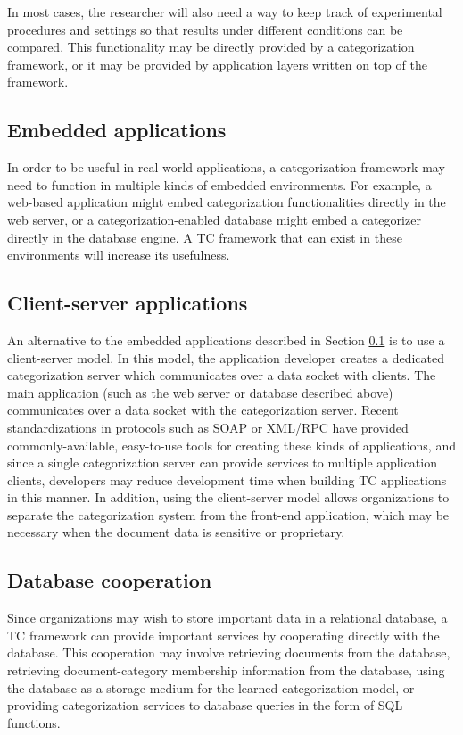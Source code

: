 In most cases, the researcher will also need a way to keep track of
experimental procedures and settings so that results under different
conditions can be compared.  This functionality may be directly
provided by a categorization framework, or it may be provided by
application layers written on top of the framework.


\subsection{Embedded applications}
\label{embedded-apps}

In order to be useful in real-world applications, a categorization
framework may need to function in multiple kinds of embedded
environments.  For example, a web-based application might embed
categorization functionalities directly in the web server, or a
categorization-enabled database might embed a categorizer directly in
the database engine.  A TC framework that can exist in these
environments will increase its usefulness.

\subsection{Client-server applications}

An alternative to the embedded applications described in Section
\ref{embedded-apps} is to use a client-server model.  In this model,
the application developer creates a dedicated categorization server
which communicates over a data socket with clients.  The main
application (such as the web server or database described above)
communicates over a data socket with the categorization server.
Recent standardizations in protocols such as SOAP or XML/RPC
\cite{XXX-xmlrpc} have provided commonly-available, easy-to-use tools
for creating these kinds of applications, and since a single
categorization server can provide services to multiple application
clients, developers may reduce development time when building TC
applications in this manner.  In addition, using the client-server
model allows organizations to separate the categorization system from
the front-end application, which may be necessary when the document
data is sensitive or proprietary.

\subsection{Database cooperation}

Since organizations may wish to store important data in a relational
database, a TC framework can provide important services by cooperating
directly with the database.  This cooperation may involve retrieving
documents from the database, retrieving document-category membership
information from the database, using the database as a storage medium
for the learned categorization model, or providing categorization
services to database queries in the form of SQL functions.

